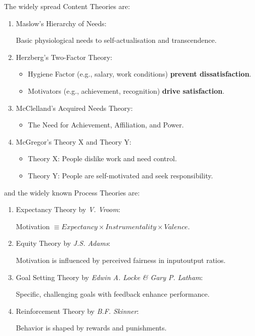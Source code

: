 \documentclass[11pt]{article}
\begin{document}
The widely spread Content Theories are:
\begin{enumerate}
	\item Maslow's Hierarchy of Needs:

Basic physiological needs to self-actualisation and transcendence.

	\item Herzberg's Two-Factor Theory:
		\begin{itemize}
			\item Hygiene Factor (e.g., salary, work conditions) \textbf{prevent dissatisfaction}.
			\item Motivators (e.g., achievement, recognition) \textbf{drive satisfaction}.
		\end{itemize}
	\item McClelland's Acquired Needs Theory:
		\begin{itemize}
			\item The Need for Achievement, Affiliation, and Power.
		\end{itemize}
	\item McGregor's Theory X and Theory Y:
		\begin{itemize}
			\item Theory X: People dislike work and need control.
			\item Theory Y: People are self-motivated and seek responsibility.
		\end{itemize}
\end{enumerate}
and the widely known Process Theories are:
\begin{enumerate}
	\item Expectancy Theory by \textit{V. Vroom}:
	\begin{center}
			Motivation $\equiv Expectancy\times Instrumentality \times {Valence} .$
	\end{center}

	\item Equity Theory by \textit{J.S. Adams}:

		Motivation is influenced by perceived fairness in input\textendash output ratios.
	\item Goal Setting Theory by \textit{Edwin A. Locke \& Gary P. Latham}:

Specific, challenging goals with feedback enhance performance.
	\item Reinforcement Theory by \textit{B.F. Skinner}:
	
Behavior is shaped by rewards and punishments.
\end{enumerate}
\end{document}
